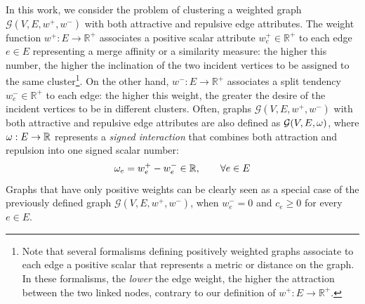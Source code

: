 In this work, we consider the problem of clustering a weighted graph $\mathcal{G}(V,E,w^+, w^-)$ with both attractive and repulsive edge attributes. The weight function $w^+: E \rightarrow \mathbb{R}^+$ associates a positive scalar attribute $w_e^+\in \mathbb{R}^+$ to each edge $e \in E$ representing a merge affinity or a similarity measure: the higher this number, the higher the inclination of the two incident vertices to be assigned to the same cluster\footnote{Note that several formalisms defining positively weighted graphs associate to each edge a positive scalar that represents a metric or distance on the graph. In these formalisms, the \emph{lower} the edge weight, the higher the attraction between the two linked nodes, contrary to our definition of $w^+: E \rightarrow \mathbb{R}^+$.}. On the other hand, $w^-: E \rightarrow \mathbb{R}^+$ associates a split tendency $w_e^- \in \mathbb{R}^+$ to each edge: the higher this weight, the greater the desire of the incident vertices to be in different clusters. 
Often, graphs $\mathcal{G}(V,E,w^+, w^-)$ with both attractive and repulsive edge attributes are also defined as $\mathcal{G}(V,E,\omega)$, where $\omega: E \rightarrow \mathbb{R}$ represents a \emph{signed interaction} that combines both attraction and repulsion into one signed scalar number: %
\begin{equation}
\omega_e = w_e^+ - w_e^- \in \mathbb{R}, \quad \quad \forall e \in E
\end{equation}
Graphs that have only positive weights can be clearly seen as a special case of the previously defined graph $\mathcal{G}(V,E,w^+,w^-)$, when $w^-_e=0$ and $c_e \geq 0$ for every $e \in E$.

